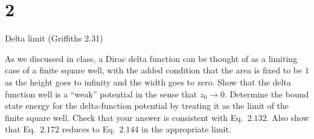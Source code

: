 \documentclass{article}
\begin{document}
\section*{2}
\begin{ques}
Delta limit (Griffiths 2.31)

As we discussed in class, a Dirac delta function can be thought of as a limiting case of a finite square well, with the added condition that the area is fixed to be $1$ as the height goes to infinity and the width goes to zero. Show that the delta function well is a ``weak'' potential in the sense that $z_0 \to 0$. Determine the bound state energy for the delta-function potential by treating it as the limit of the finite square well. Check that your answer is consistent with Eq.\ $2.132$. Also show that Eq.\ $2.172$ reduces to Eq.\ $2.144$ in the appropriate limit.
\end{ques}
\end{document}

